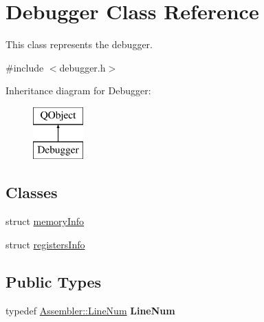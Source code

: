 \hypertarget{class_debugger}{}\section{Debugger Class Reference}
\label{class_debugger}


This class represents the debugger.  




{\ttfamily \#include $<$debugger.\+h$>$}

Inheritance diagram for Debugger\+:\begin{figure}[H]
\begin{center}
\leavevmode
\includegraphics[height=2.000000cm]{class_debugger}
\end{center}
\end{figure}
\subsection*{Classes}
\begin{DoxyCompactItemize}
\item 
struct \hyperlink{struct_debugger_1_1memory_info}{memory\+Info}
\item 
struct \hyperlink{struct_debugger_1_1registers_info}{registers\+Info}
\end{DoxyCompactItemize}
\subsection*{Public Types}
\begin{DoxyCompactItemize}
\item 
\hypertarget{class_debugger_a80544446d8b2aebeb64fc2dd21ce189f}{}typedef \hyperlink{struct_assembler_1_1_line_num}{Assembler\+::\+Line\+Num} {\bfseries Line\+Num}\label{class_debugger_a80544446d8b2aebeb64fc2dd21ce189f}

\end{DoxyCompactItemize}
